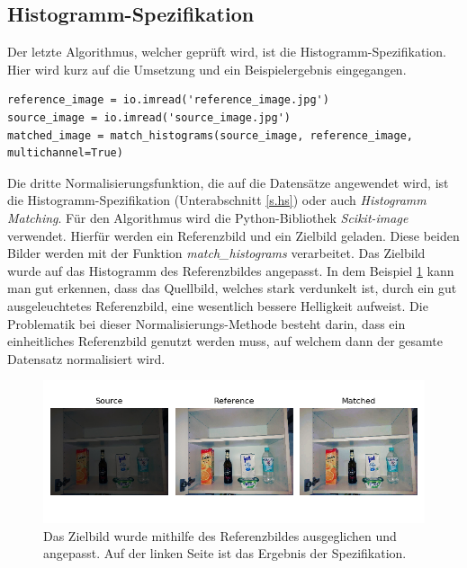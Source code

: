 \subsection{Histogramm-Spezifikation}
Der letzte Algorithmus, welcher geprüft wird, ist die Histogramm-Spezifikation. Hier wird kurz auf die Umsetzung und ein Beispielergebnis eingegangen.\\
\begin{lstlisting}
reference_image = io.imread('reference_image.jpg')
source_image = io.imread('source_image.jpg')
matched_image = match_histograms(source_image, reference_image, multichannel=True)
\end{lstlisting}
Die dritte Normalisierungsfunktion, die auf die Datensätze angewendet wird, ist die Histogramm-Spezifikation (Unterabschnitt \ref{s.hs}) oder auch \textit{Histogramm Matching}. Für den Algorithmus wird die Python-Bibliothek \textit{Scikit-image} verwendet. Hierfür werden ein Referenzbild und ein Zielbild geladen. Diese beiden Bilder werden mit der Funktion \textit{match\_histograms} verarbeitet. Das Zielbild wurde auf das Histogramm des Referenzbildes angepasst. In dem Beispiel \ref{img:histogramspez} kann man gut erkennen, dass das Quellbild, welches stark verdunkelt ist, durch ein gut ausgeleuchtetes Referenzbild, eine wesentlich bessere Helligkeit aufweist. Die Problematik bei dieser Normalisierungs-Methode besteht darin, dass ein einheitliches Referenzbild genutzt werden muss, auf welchem dann der gesamte Datensatz normalisiert wird.
\begin{figure}
	[h]
	\centering
	\includegraphics[scale=0.6]{Sources/HS_beispiel.png}
	\caption{Das Zielbild wurde mithilfe des Referenzbildes ausgeglichen und angepasst. Auf der linken Seite ist das Ergebnis der Spezifikation.}
	\label{img:histogramspez}
\end{figure}
